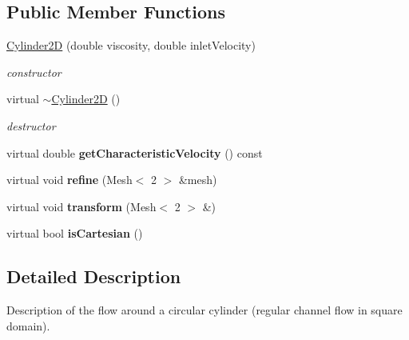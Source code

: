 \subsection*{Public Member Functions}
\begin{DoxyCompactItemize}
\item 
\hyperlink{classnatrium_1_1Cylinder2D_a38e5826b6fd4fc859b74783de3999658}{Cylinder2D} (double viscosity, double inletVelocity)
\begin{DoxyCompactList}\small\item\em constructor \item\end{DoxyCompactList}\item 
\hypertarget{classnatrium_1_1Cylinder2D_a40a33168f7deb7f35e4eb7b3f749b4a3}{
virtual \hyperlink{classnatrium_1_1Cylinder2D_a40a33168f7deb7f35e4eb7b3f749b4a3}{$\sim$Cylinder2D} ()}
\label{classnatrium_1_1Cylinder2D_a40a33168f7deb7f35e4eb7b3f749b4a3}

\begin{DoxyCompactList}\small\item\em destructor \item\end{DoxyCompactList}\item 
\hypertarget{classnatrium_1_1Cylinder2D_a6e32e2b875af680163160779aca52134}{
virtual double {\bfseries getCharacteristicVelocity} () const }
\label{classnatrium_1_1Cylinder2D_a6e32e2b875af680163160779aca52134}

\item 
\hypertarget{classnatrium_1_1Cylinder2D_aa67c905852893276844a6f9d6013cc05}{
virtual void {\bfseries refine} (Mesh$<$ 2 $>$ \&mesh)}
\label{classnatrium_1_1Cylinder2D_aa67c905852893276844a6f9d6013cc05}

\item 
\hypertarget{classnatrium_1_1Cylinder2D_a85d8d7e04217ad182ef5b0b744d1f9b5}{
virtual void {\bfseries transform} (Mesh$<$ 2 $>$ \&)}
\label{classnatrium_1_1Cylinder2D_a85d8d7e04217ad182ef5b0b744d1f9b5}

\item 
\hypertarget{classnatrium_1_1Cylinder2D_a1c1429f27ae6133ec4d54cdcd7e0c359}{
virtual bool {\bfseries isCartesian} ()}
\label{classnatrium_1_1Cylinder2D_a1c1429f27ae6133ec4d54cdcd7e0c359}

\end{DoxyCompactItemize}


\subsection{Detailed Description}
Description of the flow around a circular cylinder (regular channel flow in square domain). 

